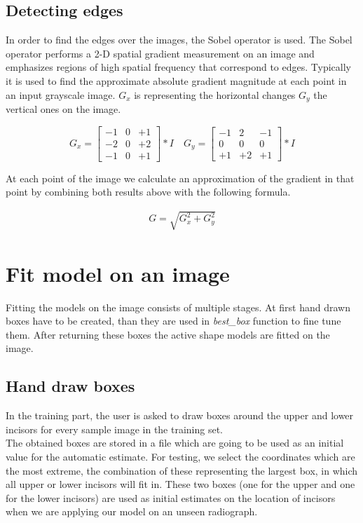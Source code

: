 \documentclass[a4paper]{article}
\begin{document}
\subsection{Detecting edges}
In order to find the edges over the images, the Sobel operator is used. The Sobel operator performs a 2-D spatial gradient measurement on an image and emphasizes regions of high spatial frequency that correspond to edges. Typically it is used to find the approximate absolute gradient magnitude at each point in an input grayscale image. \textit{$G_x$} is representing the horizontal changes \textit{$G_y$} the vertical ones on the image.

\[
  G_x=
  \begin{bmatrix}
    -1 & 0 & +1 \\
    -2 & 0 & +2 \\
    -1 & 0 & +1
  \end{bmatrix} * I\quad
  G_y=
  \begin{bmatrix}
    -1 & 2 & -1 \\
    0 & 0 & 0 \\
    +1 & +2 & +1
  \end{bmatrix} * I
\]

At each point of the image we calculate an approximation of the gradient in that point by combining both results above with the following formula.

\begin{align}
   G = \sqrt{ G_x^2 + G_y^2 }
\end{align}




\section{Fit model on an image}\label{sec:fitting}
Fitting the models on the image consists of multiple stages. At first hand drawn boxes have to be created, than they are used in \textit{best\_box} function to fine tune them. After returning these boxes the active shape models are fitted on the image.

\subsection{Hand draw boxes}
In the training part, the user is asked to draw boxes around the upper and lower incisors for every sample image in the training set. \\ 
The obtained boxes are stored in a file which are going to be used as an initial value for the automatic estimate. For testing, we select the coordinates which are the most extreme, the combination of these representing the largest box, in which all upper or lower incisors will fit in. These two boxes (one for the upper and one for the lower incisors) are used as initial estimates on the location of incisors when we are applying our model on an unseen radiograph. 
\end{document}
